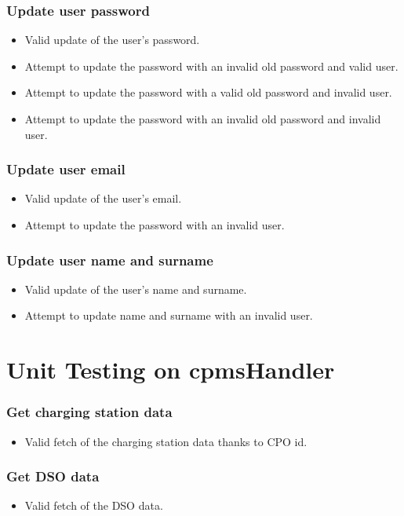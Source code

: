 \subsubsection{Update user password}
\begin{itemize}
    \item Valid update of the user's password.
    \item Attempt to update the password with an invalid old password and valid user.
    \item Attempt to update the password with a valid old password and invalid user.
    \item Attempt to update the password with an invalid old password and invalid user.
\end{itemize}
\subsubsection{Update user email}
\begin{itemize}
    \item Valid update of the user's email.
    \item Attempt to update the password with an invalid user.
\end{itemize}
\subsubsection{Update user name and surname}
\begin{itemize}
    \item Valid update of the user's name and surname.
    \item Attempt to update name and surname with an invalid user.
\end{itemize}
\section{Unit Testing on cpmsHandler}
\subsubsection{Get charging station data}
\begin{itemize}
    \item Valid fetch of the charging station data thanks to CPO id.
\end{itemize}
\subsubsection{Get DSO data}
\begin{itemize}
    \item Valid fetch of the DSO data.
\end{itemize}
